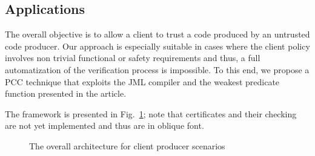 
\subsection{Applications}
\label{architecture_s}  


The overall objective is to allow a client to trust a code produced by an untrusted code producer. Our approach is especially suitable
 in cases where the client policy involves non trivial functional or safety requirements and thus, a full automatization of the verification 
process is impossible. To this end, we propose a PCC technique that exploits the JML compiler and the weakest predicate function presented in the article. 
 
 The framework is presented in Fig.~\ref{architecture}; note that certificates and their checking are not yet implemented
 and thus are in oblique font.
  


 \begin{figure}[!tbp]
 \centering
{}
\caption{\sc The overall architecture for client producer scenarios }
\label{architecture}
\end{figure}

